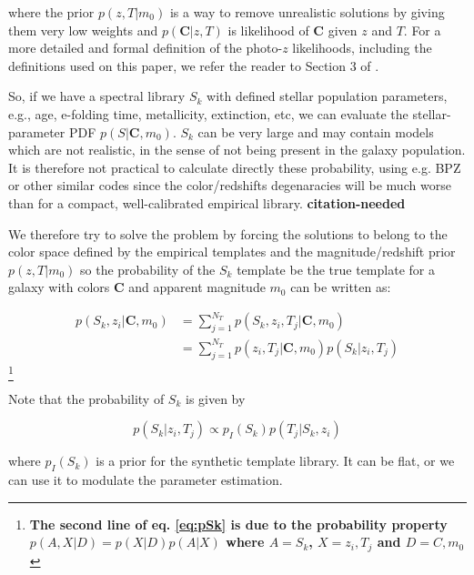 \documentclass[a4paper, useAMS, usenatbib, hyperpdf]{mn2e}
\begin{document}
\noindent where the prior $p(z,T|m_0)$ is a way to remove unrealistic solutions by giving them very low weights and $p(\mathbf{C}|z,T)$ is likelihood of $\mathbf{C}$ given $z$ and $T$.
For a more detailed and formal definition of the photo-$z$ likelihoods, including the definitions used on this paper, we refer the reader to Section 3 of \cite{Benitez.2000a}.

So, if we have a spectral library $S_k$ with defined stellar population parameters, e.g., age, e-folding time, metallicity, extinction, etc, we can evaluate the stellar-parameter PDF $p(S|\mathbf{C}, m_0)$. $S_{k}$ can be very large and may contain models which are not realistic, in the sense of not being present in the galaxy population. It is therefore not
practical to calculate directly these probability, using e.g. BPZ or other similar codes since the color/redshifts degenaracies will be much worse than for a compact, well-calibrated empirical library. {\bf \color{red} citation-needed}

We therefore try to solve the problem by forcing the solutions to belong to the color space defined by the empirical templates and the magnitude/redshift prior $p(z,T|m_{0})$ so the probability of the $S_k$ template be the true template for a galaxy with colors $\mathbf{C}$ and apparent magnitude $m_0$ can be written as:

\begin{equation}
\label{eq:pSk}
\begin{split}
p(S_{k},z_{i}|\mathbf{C},m_{0}) & =\sum_{j=1}^{N_{T}}p(S_{k},z_{i},T_{j}|\mathbf{C},m_{0}) \\
& =\sum_{j=1}^{N_{T}}p(z_{i},T_{j}|\mathbf{C},m_{0})p(S_{k}|z_{i},T_{j})
\end{split}
\end{equation}
\footnote{\color{red} \bf The second line of eq. \ref{eq:pSk} is due to the probability property $p(A,X|D) = p(X|D) p(A|X)$ where $A=S_k$, $X=z_i,T_j$ and $D=C,m_0$}

Note that the probability of $S_k$ is given by %

\begin{equation}
\label{eq:prob_model}
p(S_{k}|z_{i},T_{j})\propto p_{I}(S_{k})p(T_{j}|S_{k},z_{i})
\end{equation}

\noindent where $p_{I}(S_{k})$ is a prior for the synthetic template library. It can be flat, or we can use it to modulate the parameter estimation.
\end{document}
